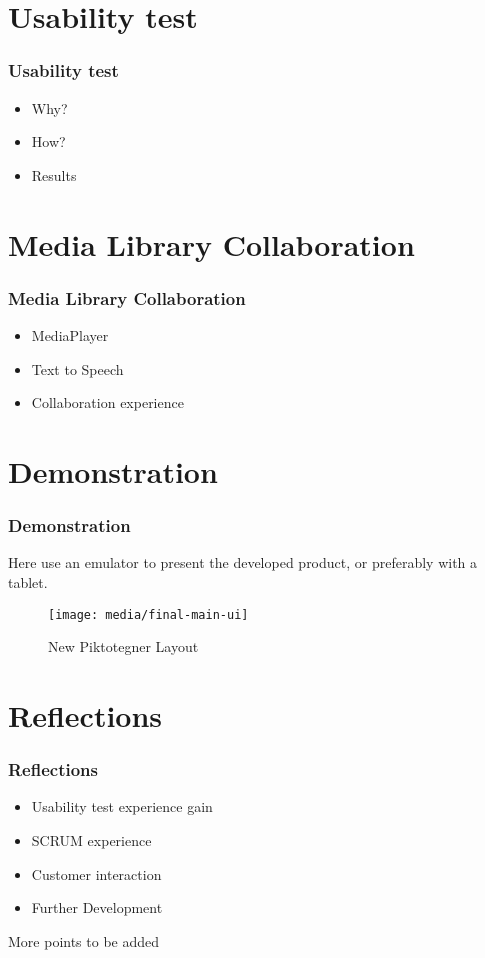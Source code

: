 \documentclass[10pt]{beamer}
\begin{document}
	\section{Usability test}
		\begin{frame}
		\frametitle{Usability test}
		\begin{itemize}
			\item Why?
			\item How?
			\item Results
		\end{itemize}
	
		\end{frame}
	
	\section{Media Library Collaboration}
		\begin{frame}
		\frametitle{Media Library Collaboration}
		\begin{itemize}
			\item MediaPlayer
			\item Text to Speech
			\item Collaboration experience
		\end{itemize}

		\end{frame}
		
	\section{Demonstration}
	
		\begin{frame}
		\frametitle{Demonstration}
		Here use an emulator to present the developed product, or preferably with a tablet.
			\begin{figure}
				\texttt{[image: media/final-main-ui]}
				\caption{New Piktotegner Layout}
			\end{figure}
		\end{frame}		

	\section{Reflections}
		\begin{frame}
		\frametitle{Reflections}
		\begin{itemize}
			\item Usability test experience gain
			\item SCRUM experience
			\item Customer interaction
			\item Further Development
		\end{itemize}
		More points to be added
		\end{frame}


	\bgroup
	\begin{frame}[plain]{}
	\addtocounter{framenumber}{-1}	
		\begin{center}
		\end{center}
	\end{frame}
	\egroup
\end{document}
